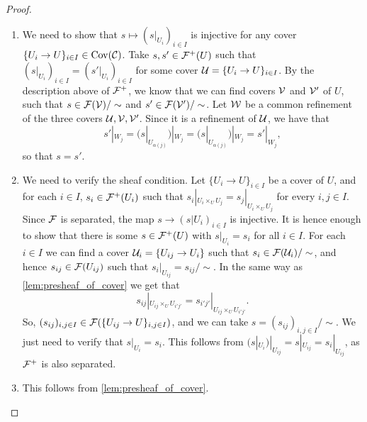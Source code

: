\documentclass{article}
\DeclareMathOperator{\Cov}{Cov}
\begin{document}
\begin{proof}
    \leavevmode
    \begin{enumerate}
        \item We need to show that $s \mapsto (s|_{U_i})_{i\in I}$ is injective
              for any cover $\{U_i \to U\}_{i \in I} \in \Cov(\mcC)$.
              Take $s, s' \in \mathcal{F}^+(U)$ such that
              $(s|_{U_i})_{i\in I} = (s'|_{U_i})_{i\in I}$ for some
              cover $\mathcal{U} = \{U_i \to U\}_{i\in I}$.
              By the description above of $\mathcal{F}^+$, we know that
              we can find covers $\mathcal{V}$ and $\mathcal{V}'$ of $U$,
              such that $s\in \mathcal{F}(\mathcal{V})/\sim$ and $s'\in\mathcal{F} (\mathcal{V}')/\sim$.
              Let $\mathcal{W}$ be a common refinement of the three covers
              $\mathcal{U}, \mathcal{V}, \mathcal{V}'$. Since it is a refinement of $\mathcal{U}$,
              we have that
              \begin{equation*}
                  s'|_{W_j} = (s|_{U_{\alpha(j)}})|_{W_j} =
                  (s|_{U_{\alpha(j)}})|_{W_j} = s'|_{W_j},
              \end{equation*}
              so that $s=s'$.
        \item We need to verify the sheaf condition. Let $\{U_i \to U\}_{i\in I}$
              be a cover of $U$, and for each $i\in I$, $s_i \in \mathcal{F}^+(U_i)$ such that
              $s_i |_{U_i \times_U U_j} = s_j |_ {U_i \times_U U_j}$ for every $i,j \in I$.
              Since $\mathcal{F}$ is separated, the map $s \to (s|{U_i})_{i\in I}$ is injective.
              It is hence enough to show that there is some $s\in \mathcal{F}^+(U)$ with
              $s|_{U_i} = s_i$ for all $i\in I$.
              For each $i\in I$ we can find a cover $\mathcal{U}_i = \{U_{ij} \to U_i\}$
              such that $s_i \in \mathcal{F}(\mathcal{U}_i)/\sim$, and hence $s_{ij} \in \mathcal{F}(U_{ij})$
              such that $s_i |_{U_{ij}} = s_{ij}/\sim$. In the same way
              as \cref{lem:presheaf_of_cover} we get that
              \begin{equation*}
                  s_{ij}|_{U_{ij}\times_U U_{i'j'}} = s_{i'j'}|_{U_{ij}\times_U U_{i'j'}}.
              \end{equation*}
              So, $(s_{ij})_{i,j\in I} \in \mathcal{F}(\{U_{ij}\to U\}_{i,j\in I})$, and we can
              take $s = (s_{ij})_{i,j\in I}/\sim$.
              We just need to verify that $s|_{U_i} = s_i$. This follows
              from $(s|_{U_i})|_{U_{ij}} = s|_{U_{ij}} = s_i|_{U_{ij}}$, as $\mathcal{F}^+$ is
              also separated.
        \item This follows from \cref{lem:presheaf_of_cover}.
    \end{enumerate}
\end{proof}
\end{document}
